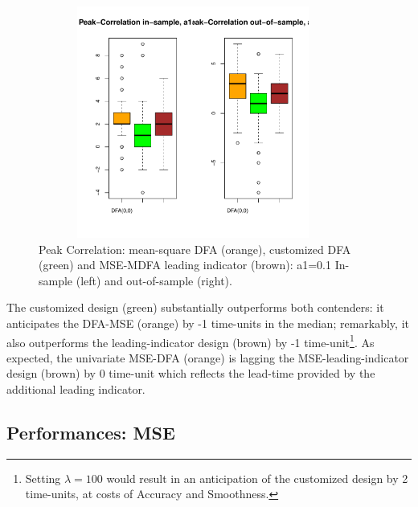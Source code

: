 \documentclass[a4paper]{book}
\begin{document}
\begin{figure}[H]\begin{center}\includegraphics[height=3in, width=4in]{z_peak_cor_dfacust_leadind}\caption{Peak Correlation: mean-square DFA (orange), customized DFA (green) and MSE-MDFA leading indicator (brown): a1=0.1 In-sample (left) and out-of-sample (right).\label{z_peak_cor_dfacust_leadind}}\end{center}\end{figure}The customized design (green) substantially outperforms both contenders: it anticipates the DFA-MSE (orange) by -1 time-units in the median; remarkably, it also outperforms the leading-indicator design (brown) by -1 time-unit\footnote{Setting $\lambda=100$ would result in an anticipation of the customized design by 2 time-units, at costs of Accuracy and Smoothness.}. As expected, the univariate MSE-DFA (orange) is lagging the MSE-leading-indicator design (brown) by 0 time-unit which reflects the lead-time provided by  the additional leading indicator.




\subsection{Performances: MSE}
\end{document}
